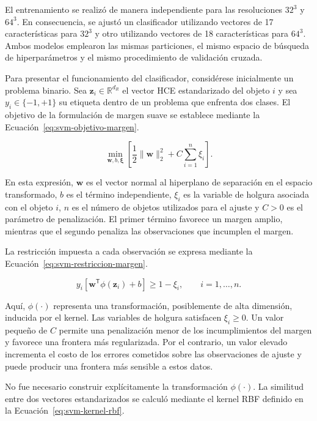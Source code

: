El entrenamiento se realizó de manera independiente para las resoluciones $32^3$ y $64^3$. En consecuencia, se ajustó un clasificador utilizando vectores de 17 características para $32^3$ y otro utilizando vectores de 18 características para $64^3$. Ambos modelos emplearon las mismas particiones, el mismo espacio de búsqueda de hiperparámetros y el mismo procedimiento de validación cruzada.

Para presentar el funcionamiento del clasificador, considérese inicialmente un problema binario. Sea $\mathbf z_i\in\mathbb R^{d_R}$ el vector HCE estandarizado del objeto $i$ y sea $y_i\in\{-1,+1\}$ su etiqueta dentro de un problema que enfrenta dos clases. El objetivo de la formulación de margen suave se establece mediante la Ecuación~\eqref{eq:svm-objetivo-margen}.

\begin{equation}
\min_{\mathbf w,b,\boldsymbol{\xi}}
\left[
\frac{1}{2}\|\mathbf w\|_2^2
+
C\sum_{i=1}^{n}\xi_i
\right].
\label{eq:svm-objetivo-margen}
\end{equation}

En esta expresión, $\mathbf w$ es el vector normal al hiperplano de separación en el espacio transformado, $b$ es el término independiente, $\xi_i$ es la variable de holgura asociada con el objeto $i$, $n$ es el número de objetos utilizados para el ajuste y $C>0$ es el parámetro de penalización. El primer término favorece un margen amplio, mientras que el segundo penaliza las observaciones que incumplen el margen.

La restricción impuesta a cada observación se expresa mediante la Ecuación~\eqref{eq:svm-restriccion-margen}.

\begin{equation}
y_i
\left[
\mathbf w^{\mathsf T}\phi(\mathbf z_i)+b
\right]
\geq
1-\xi_i,
\qquad
i=1,\ldots,n.
\label{eq:svm-restriccion-margen}
\end{equation}

Aquí, $\phi(\cdot)$ representa una transformación, posiblemente de alta dimensión, inducida por el kernel. Las variables de holgura satisfacen $\xi_i\geq0$. Un valor pequeño de $C$ permite una penalización menor de los incumplimientos del margen y favorece una frontera más regularizada. Por el contrario, un valor elevado incrementa el costo de los errores cometidos sobre las observaciones de ajuste y puede producir una frontera más sensible a estos datos.

No fue necesario construir explícitamente la transformación $\phi(\cdot)$. La similitud entre dos vectores estandarizados se calculó mediante el kernel RBF definido en la Ecuación~\eqref{eq:svm-kernel-rbf}.

